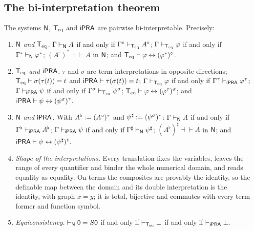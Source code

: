 \subsection{The bi-interpretation theorem}

\begin{theorem}[Bi-interpretation]
\label{base:thm:bridge}
The systems $\mathsf{N}$, $\mathsf{T}_{\mathrm{eq}}$ and $\mathsf{iPRA}$ are pairwise bi-interpretable.
Precisely:
\begin{enumerate}[label=\textup{(\roman*)}]
\item \emph{$\mathsf{N}$ and $\mathsf{T}_{\mathrm{eq}}$.}  $\Gamma\vdash_{\mathsf{N}}A$ if and only if
 $\Gamma^\circ\vdash_{\mathsf{T}_{\mathrm{eq}}}A^\circ$; $\Gamma\vdash_{\mathsf{T}_{\mathrm{eq}}}\varphi$ if and
 only if $\Gamma^{*}\vdash_{\mathsf{N}}\varphi^{*}$;
 $(A^\circ)^{*}\dashv\vdash A$ in $\mathsf{N}$; and
 $\mathsf{T}_{\mathrm{eq}}\vdash\varphi\leftrightarrow(\varphi^{*})^\circ$.
\item \emph{$\mathsf{T}_{\mathrm{eq}}$ and $\mathsf{iPRA}$.}  $\tau$ and $\sigma$ are term
 interpretations in opposite directions;
 $\mathsf{T}_{\mathrm{eq}}\vdash\sigma(\tau(t))=t$ and $\mathsf{iPRA}\vdash\tau(\sigma(t))=t$;
 $\Gamma\vdash_{\mathsf{T}_{\mathrm{eq}}}\varphi$ if and only if
 $\Gamma^{\tau}\vdash_{\mathsf{iPRA}}\varphi^{\tau}$;
 $\Gamma\vdash_{\mathsf{iPRA}}\psi$ if and only if
 $\Gamma^{\sigma}\vdash_{\mathsf{T}_{\mathrm{eq}}}\psi^{\sigma}$;
 $\mathsf{T}_{\mathrm{eq}}\vdash\varphi\leftrightarrow(\varphi^{\tau})^{\sigma}$; and
 $\mathsf{iPRA}\vdash\psi\leftrightarrow(\psi^{\sigma})^{\tau}$.
\item \emph{$\mathsf{N}$ and $\mathsf{iPRA}$.}  With $A^{\flat}\mathrel{:=}(A^\circ)^{\tau}$
 and $\psi^{\sharp}\mathrel{:=}(\psi^{\sigma})^{*}$:
 $\Gamma\vdash_{\mathsf{N}}A$ if and only if
 $\Gamma^{\flat}\vdash_{\mathsf{iPRA}}A^{\flat}$;
 $\Gamma\vdash_{\mathsf{iPRA}}\psi$ if and only if
 $\Gamma^{\sharp}\vdash_{\mathsf{N}}\psi^{\sharp}$;
 $(A^{\flat})^{\sharp}\dashv\vdash A$ in $\mathsf{N}$; and
 $\mathsf{iPRA}\vdash\psi\leftrightarrow(\psi^{\sharp})^{\flat}$.
\item \emph{Shape of the interpretations.}  Every translation fixes the
 variables, leaves the range of every quantifier and binder the whole
 numerical domain, and reads equality as equality.  On terms the composites
 are provably the identity, so the definable map between the domain and its
 double interpretation is the identity, with graph $x=y$; it is total,
 bijective and commutes with every term former and function symbol.
\item \emph{Equiconsistency.}  $\vdash_{\mathsf{N}}0=S 0$ if and only if
 $\vdash_{\mathsf{T}_{\mathrm{eq}}}\bot$ if and only if $\vdash_{\mathsf{iPRA}}\bot$.
\end{enumerate}
\end{theorem}

